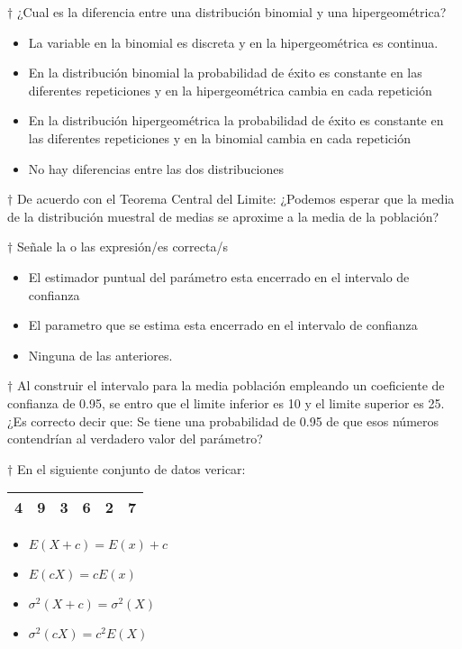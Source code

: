 \documentclass[10pt,a4paper]{article}
\begin{document}
$\dagger$ ¿Cual es la diferencia entre una distribución binomial y una hipergeométrica?
\begin{itemize}
	\renewcommand{\labelitemi}{\raisebox{-.25\height}{\huge$\square$}}
	\item La variable en la binomial es discreta y en la hipergeométrica es continua.
	\item En la distribución binomial la probabilidad de éxito es constante en las diferentes repeticiones y en la hipergeométrica cambia en cada repetición
	\item En la distribución hipergeométrica la probabilidad de éxito es constante en las diferentes repeticiones y en la binomial cambia en cada repetición
	\item No hay diferencias entre las dos distribuciones
\end{itemize}

$\dagger$  De acuerdo con el Teorema Central del Limite: ¿Podemos esperar que la media de la distribución muestral de medias se aproxime a la media de la población?

$\dagger$ Señale la o las expresión/es correcta/s
\begin{itemize}
	\renewcommand{\labelitemi}{\raisebox{-.25\height}{\huge$\square$}}
	\item El estimador puntual del parámetro esta encerrado en el intervalo de confianza
	\item El parametro que se estima esta encerrado en el intervalo de confianza
	\item Ninguna de las anteriores.
\end{itemize}

$\dagger$ Al construir el intervalo para la media población empleando un coeficiente de confianza de 0.95, se entro que el limite inferior es 10 y el limite superior es 25. ¿Es correcto decir que: Se tiene una probabilidad de 0.95 de que esos números contendrían al verdadero valor del parámetro?

$\dagger$ En el siguiente conjunto de datos vericar:

\begin{center}
	\begin{tabular}{|c|c|c|c|c|c|}
		\hline 
		4 & 9 & 3 & 6 & 2 & 7 \\ 
		\hline 
	\end{tabular} 
\end{center}

\begin{itemize}
	\item $E(X+c) = E(x)+c$
	\item $E(cX) = cE(x)$
	\item $\sigma^2(X+c)=\sigma^2(X)$
	\item $\sigma^2(cX)=c^2E(X)$
\end{itemize}
\end{document}
